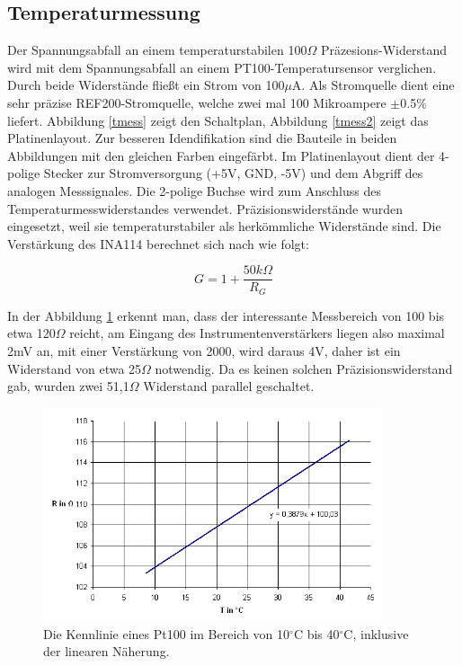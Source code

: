 \documentclass[a4paper,bibtotoc,oneside]{scrbook}
\begin{document}
\subsection{Temperaturmessung}\thispagestyle{empty}
Der Spannungsabfall an einem temperaturstabilen 100$\Omega$ Präzesions-Widerstand wird mit dem Spannungsabfall an einem PT100-Temperatursensor verglichen. Durch beide Widerstände fließt ein Strom von 100$\mu$A. Als Stromquelle dient eine sehr präzise REF200-Stromquelle\cite{ref200}, welche zwei mal 100 Mikroampere $\pm$0.5$\%$ liefert. Abbildung \ref{tmess} zeigt den Schaltplan, Abbildung \ref{tmess2} zeigt das Platinenlayout. Zur besseren Idendifikation sind die Bauteile in beiden Abbildungen mit den gleichen Farben eingefärbt. 
Im Platinenlayout dient der 4-polige Stecker zur Stromversorgung (+5V, GND, -5V) und dem Abgriff des analogen Messsignales. Die 2-polige Buchse wird zum Anschluss des Temperaturmesswiderstandes verwendet.
Präzisionswiderstände wurden eingesetzt, weil sie temperaturstabiler als herkömmliche Widerstände sind. 
Die Verstärkung des INA114 berechnet sich nach \cite{ina114} wie folgt:

\begin{equation}
 G = 1 + \frac{50k\Omega}{R_G}
\end{equation} 

\noindent In der Abbildung \ref{pt100} erkennt man, dass der interessante Messbereich von 100 bis etwa 120$\Omega$ reicht, am Eingang des Instrumentenverstärkers liegen also maximal 2mV an, mit einer Verstärkung von 2000, wird daraus 4V, daher ist ein Widerstand von etwa 25$\Omega$ notwendig. Da es keinen solchen Präzisionswiderstand gab, wurden zwei 51,1$\Omega$ Widerstand parallel geschaltet. 

\begin{figure}[htbp]
\centering
\includegraphics[width=100mm]{img/pt100.png}
\caption{Die Kennlinie eines Pt100 im Bereich von  	10$^{\circ}$C bis 40$^{\circ}$C, inklusive der linearen Näherung.}\label{pt100}
\end{figure}
\end{document}
